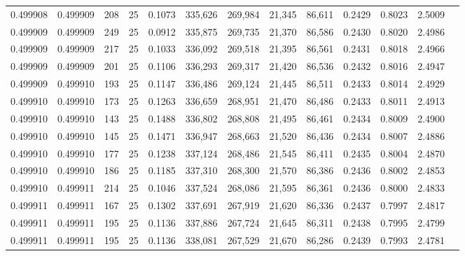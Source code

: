\begin{tabular}{rrrrrrrrrrrrr}
0.499908 & 0.499909 &   208 &  25 &                                     0.1073 & 335,626 & 269,984 &  21,345 &  86,611 & 0.2429 & 0.8023 & 2.5009 \\
0.499909 & 0.499909 &   249 &  25 &                                     0.0912 & 335,875 & 269,735 &  21,370 &  86,586 & 0.2430 & 0.8020 & 2.4986 \\
0.499909 & 0.499909 &   217 &  25 &                                     0.1033 & 336,092 & 269,518 &  21,395 &  86,561 & 0.2431 & 0.8018 & 2.4966 \\
0.499909 & 0.499909 &   201 &  25 &                                     0.1106 & 336,293 & 269,317 &  21,420 &  86,536 & 0.2432 & 0.8016 & 2.4947 \\
0.499909 & 0.499910 &   193 &  25 &                                     0.1147 & 336,486 & 269,124 &  21,445 &  86,511 & 0.2433 & 0.8014 & 2.4929 \\
0.499910 & 0.499910 &   173 &  25 &                                     0.1263 & 336,659 & 268,951 &  21,470 &  86,486 & 0.2433 & 0.8011 & 2.4913 \\
0.499910 & 0.499910 &   143 &  25 &                                     0.1488 & 336,802 & 268,808 &  21,495 &  86,461 & 0.2434 & 0.8009 & 2.4900 \\
0.499910 & 0.499910 &   145 &  25 &                                     0.1471 & 336,947 & 268,663 &  21,520 &  86,436 & 0.2434 & 0.8007 & 2.4886 \\
0.499910 & 0.499910 &   177 &  25 &                                     0.1238 & 337,124 & 268,486 &  21,545 &  86,411 & 0.2435 & 0.8004 & 2.4870 \\
0.499910 & 0.499910 &   186 &  25 &                                     0.1185 & 337,310 & 268,300 &  21,570 &  86,386 & 0.2436 & 0.8002 & 2.4853 \\
0.499910 & 0.499911 &   214 &  25 &                                     0.1046 & 337,524 & 268,086 &  21,595 &  86,361 & 0.2436 & 0.8000 & 2.4833 \\
0.499911 & 0.499911 &   167 &  25 &                                     0.1302 & 337,691 & 267,919 &  21,620 &  86,336 & 0.2437 & 0.7997 & 2.4817 \\
0.499911 & 0.499911 &   195 &  25 &                                     0.1136 & 337,886 & 267,724 &  21,645 &  86,311 & 0.2438 & 0.7995 & 2.4799 \\
0.499911 & 0.499911 &   195 &  25 &                                     0.1136 & 338,081 & 267,529 &  21,670 &  86,286 & 0.2439 & 0.7993 & 2.4781 \\

\end{tabular}
